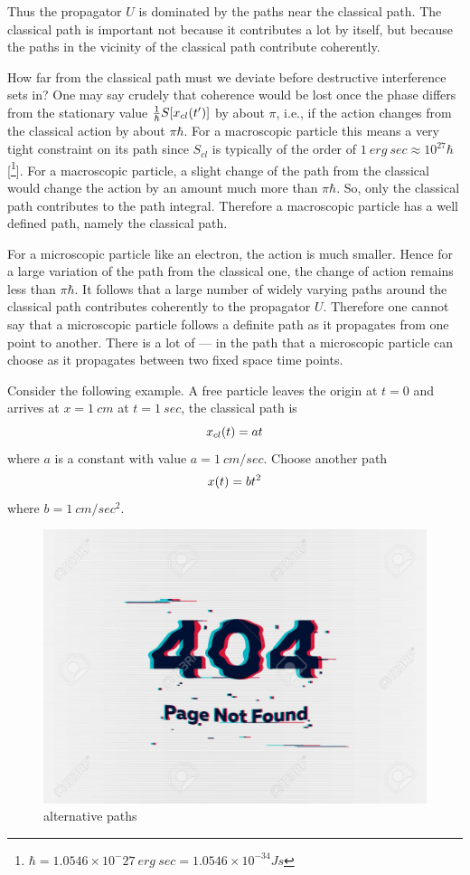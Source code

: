 	
	
	
	Thus the propagator $U$ is dominated by the paths near the classical path. The classical path is important not because it contributes a lot by itself, but because the paths in the vicinity of the classical path contribute coherently.
	
	
	
	How far from the classical path must we deviate before destructive interference sets in? One may say crudely that coherence would be lost once the phase differs from the stationary value $\frac{1}{\hbar} S\qty[x_{cl}(t^\prime)]$ by about $\pi$, i.e., if the action changes from the classical action by about $\pi \hbar$. For a macroscopic particle this means a very tight constraint on its path since $S_{cl}$ is typically of the order of $1\ erg\ sec \approx 10^{27} \hbar$[\footnote{$\hbar = 1.0546 \times 10^-27 \ erg\ sec = 1.0546 \times 10^{-34} J s$}]. For a macroscopic particle, a slight change of the path from the classical would change the action by an amount much more than $\pi \hbar$. So, only the classical path contributes to the path integral. Therefore a macroscopic particle has a well defined path, namely the classical path. 
	
	
	For a microscopic particle like an electron, the action is much smaller. Hence for a large variation of the path from the classical one, the change of action remains less than $\pi \hbar$. It follows that a large number of widely varying paths around the classical path contributes coherently to the propagator $U$. Therefore one cannot say that a microscopic particle follows a definite path as it propagates from one point to another. There is  a lot of --- in the path that a microscopic particle can choose as it propagates between two fixed space time points.
	
	
	Consider the following example. A free particle leaves the origin at $t=0$ and arrives at $x=1\ cm$ at $t= 1 \ sec$, the classical path is 
	\begin{equation}
		x_{cl}\qty(t) = a t
	\end{equation}
	where $a$ is a constant with value $a=1\ cm/sec$. Choose another path
	\begin{equation}
		x\qty(t) = b t^2
	\end{equation}
	where $b= 1\ cm/sec^2$.
	
	
	\begin{figure}
		\centering
		\includegraphics[width=0.5\linewidth]{Pictures/not-found.jpg}
		\caption{alternative paths}
	\end{figure}


